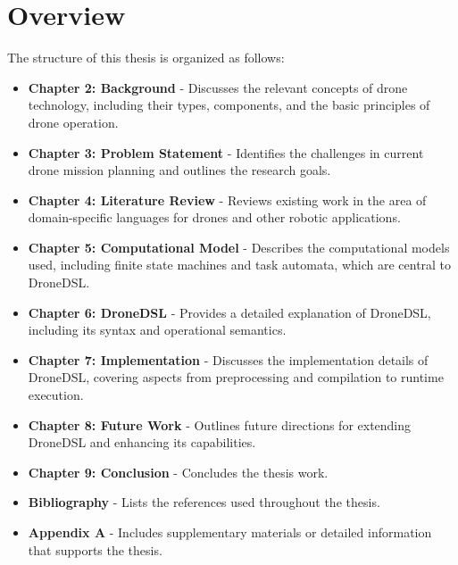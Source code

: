 \section{Overview}
The structure of this thesis is organized as follows:
\begin{itemize}
    \item \textbf{Chapter 2: Background} - Discusses the relevant concepts of drone technology, including their types, components, and the basic principles of drone operation.
    \item \textbf{Chapter 3: Problem Statement} - Identifies the challenges in current drone mission planning and outlines the research goals.
    \item \textbf{Chapter 4: Literature Review} - Reviews existing work in the area of domain-specific languages for drones and other robotic applications.
    \item \textbf{Chapter 5: Computational Model} - Describes the computational models used, including finite state machines and task automata, which are central to DroneDSL.
    \item \textbf{Chapter 6: DroneDSL} - Provides a detailed explanation of DroneDSL, including its syntax and operational semantics.
    \item \textbf{Chapter 7: Implementation} - Discusses the implementation details of DroneDSL, covering aspects from preprocessing and compilation to runtime execution.
    \item \textbf{Chapter 8: Future Work} - Outlines future directions for extending DroneDSL and enhancing its capabilities.
    \item \textbf{Chapter 9: Conclusion} - Concludes the thesis work.
    \item \textbf{Bibliography} - Lists the references used throughout the thesis.
    \item \textbf{Appendix A} - Includes supplementary materials or detailed information that supports the thesis.
\end{itemize}
